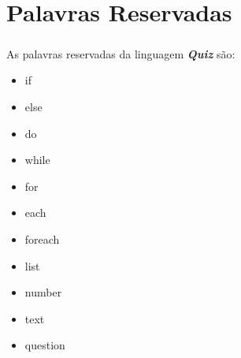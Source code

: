 \documentclass{report}
\begin{document}





\chapter{Palavras Reservadas}
\label{chap.words}

\paragraph{}

As palavras reservadas da linguagem \textbf{\textit{Quiz}} são:

\begin{itemize}
	\item if
	\item else
	\item do
	\item while
	\item for
	\item each
	\item foreach
	\item list
	\item number
	\item text
	\item question
\end{itemize}


	
\end{document}
